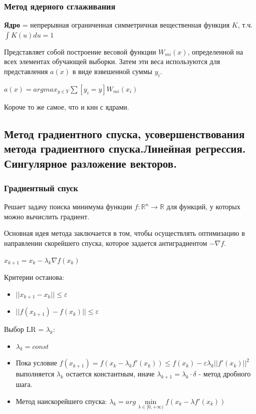 \documentclass{article}
\begin{document}
\subsubsection{Метод ядерного сглаживания}

\textbf{Ядро} = непрерывная ограниченная симметричная вещественная функция
$K$, т.ч. $\int K (u) du = 1$

Представляет собой построение весовой функции $W_{mi} (x)$, определенной
на всех элементах обучающей выборки. Затем эти веса используются для
представления $a(x)$ в виде взвешенной суммы $y_i$.

$a(x) = argmax_{y \in Y} \sum [y_i = y] W_{mi} (x_i)$

Короче то же самое, что и кнн с ядрами.


\subsection{Метод градиентного спуска, усовершенствования метода градиентного
спуска.Линейная регрессия. Сингулярное разложение векторов.}

\subsubsection{Градиентный спуск}

Решает задачу поиска минимума функции $f: \mathbb{R}^n \to \mathbb{R}$ для
функций, у которых можно вычислить градиент.

Основная идея метода заключается в том, чтобы осуществлять оптимизацию
в направлении скорейшего спуска, которое задается антиградиентом $-\nabla f$.

$x_{k+1} = x_k - \lambda_k \nabla f(x_k)$

Критерии останова:
\begin{itemize}
	\item $||x_{k+1} - x_{k}|| \leq \varepsilon$
	\item $||f(x_{k+1}) - f(x_k)|| \leq \varepsilon$
\end{itemize}

Выбор LR = $\lambda_k$:
\begin{itemize}
	\item $\lambda_k = const$
	\item Пока условие $f(x_{k+1}) = f(x_k - \lambda_k f'(x_k)) \leq
	f(x_k) - \varepsilon\lambda_k ||f'(x_k)||^2$ выполняется $\lambda_k$
	остается константным, иначе $\lambda_{k+1} = \lambda_k \cdot \delta$
	- метод дробного шага.
	\item Метод наискорейшего спуска: $\lambda_k = arg 
	\min\limits_{\lambda \in [0, +\infty)} f(x_k - \lambda f'(x_k))$
\end{itemize}
\end{document}
